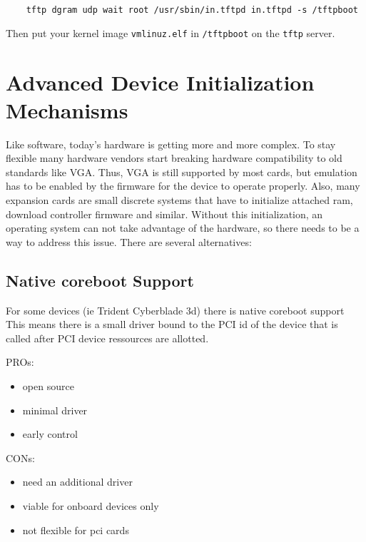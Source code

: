\documentclass[titlepage,12pt]{article}
\begin{document}
\begin{verbatim}
    tftp dgram udp wait root /usr/sbin/in.tftpd in.tftpd -s /tftpboot
\end{verbatim}

Then put your kernel image \texttt{vmlinuz.elf} in \texttt{/tftpboot} on
the \texttt{tftp} server.


\newpage

%
%

\section{Advanced Device Initialization Mechanisms}

Like software, today's hardware is getting more and more complex. To
stay flexible many hardware vendors start breaking hardware
compatibility to old standards like VGA. Thus, VGA is still supported by
most cards, but emulation has to be enabled by the firmware for the
device to operate properly.  Also, many expansion cards are small
discrete systems that have to initialize attached ram, download
controller firmware and similar. Without this initialization, an
operating system can not take advantage of the hardware, so there needs
to be a way to address this issue. There are several alternatives:

\subsection{Native coreboot Support}

For some devices (ie Trident Cyberblade 3d) there is native coreboot
support This means there is a small driver bound to the PCI id of the
device that is called after PCI device ressources are allotted.

PROs:
 \begin{itemize}
 \item open source
 \item minimal driver
 \item early control
 \end{itemize}

CONs:
 \begin{itemize}
 \item need an additional driver
 \item viable for onboard devices only
 \item not flexible for pci cards
 \end{itemize}
\end{document}
